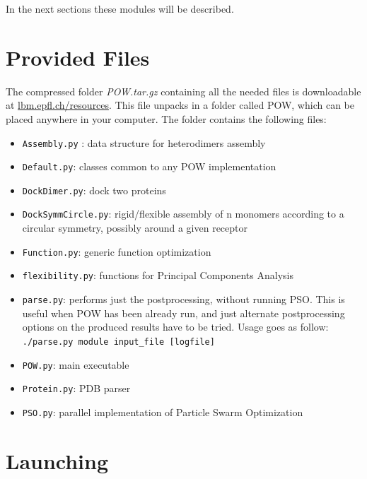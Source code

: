 \documentclass[a4paper, 12pt]{article}
\begin{document}
In the next sections these modules will be described.


\section{Provided Files}

The compressed folder \emph{POW.tar.gz} containing all the needed files is downloadable at \href{http://lbm.epfl.ch/resources}{lbm.epfl.ch/resources}. This file unpacks in a folder called POW, which can be placed anywhere in your computer. The folder contains the following files:
\begin{itemize}
\item \texttt{Assembly.py} : data structure for heterodimers assembly
\item \texttt{Default.py}: classes common to any POW implementation
\item \texttt{DockDimer.py}: dock two proteins
\item \texttt{DockSymmCircle.py}: rigid/flexible assembly of n monomers according to a circular symmetry, possibly around a given receptor
\item \texttt{Function.py}: generic function optimization
\item \texttt{flexibility.py}: functions for Principal Components Analysis
\item \texttt{parse.py}: performs just the postprocessing, without running PSO. This is useful when POW has been already run, and just alternate postprocessing options on the produced results have to be tried. Usage goes as follow:\\
\texttt{./parse.py module input\_file [logfile]}
\item \texttt{POW.py}: main executable
\item \texttt{Protein.py}: PDB parser
\item \texttt{PSO.py}: parallel implementation of Particle Swarm Optimization
\end{itemize}


\section{Launching}
\end{document}
